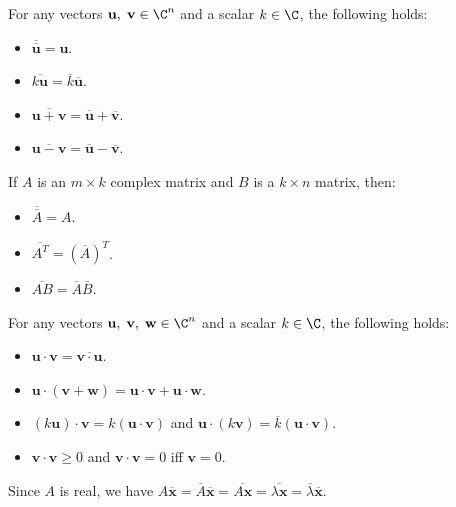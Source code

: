 For any vectors \(\mathbf{u},\;\mathbf{v} \in \C^n\) and a scalar \(k \in \C\), the following holds:
\begin{itemize}
    \item \(\overline{\overline{\mathbf{u}}} = \mathbf{u}\).
    \item \(\overline{k\mathbf{u}} = \overline{k}\overline{\mathbf{u}}\).
    \item \(\overline{\mathbf{u} + \mathbf{v}} = \overline{\mathbf{u}} + \overline{\mathbf{v}}\).
    \item \(\overline{\mathbf{u} - \mathbf{v}} = \overline{\mathbf{u}} - \overline{\mathbf{v}}\).
\end{itemize}
If \(A\) is an \(m \times k\) complex matrix and \(B\) is a \(k \times n\) matrix, then:
\begin{itemize}
    \item \(\overline{\overline{A}} = A\).
    \item \(\overline{A^T} = (\overline{A})^T\).
    \item \(\overline{AB} = \overline{A}\overline{B}\).
\end{itemize}
For any vectors \(\mathbf{u},\;\mathbf{v},\;\mathbf{w} \in \C^n\) and a scalar \(k \in \C\), the following holds:
\begin{itemize}
    \item \(\mathbf{u} \cdot \mathbf{v} = \overline{\mathbf{v} \cdot \mathbf{u}}\).
    \item \(\mathbf{u} \cdot (\mathbf{v} + \mathbf{w}) = \mathbf{u} \cdot \mathbf{v} + \mathbf{u} \cdot \mathbf{w}\).
    \item \((k \mathbf{u}) \cdot \mathbf{v} = k(\mathbf{u} \cdot \mathbf{v})\) and \(\mathbf{u} \cdot (k \mathbf{v}) = \overline{k}(\mathbf{u} \cdot \mathbf{v})\).
    \item \(\mathbf{v} \cdot \mathbf{v} \geq 0\) and \(\mathbf{v} \cdot \mathbf{v} = 0\) iff \(\mathbf{v} = 0\).
\end{itemize}

{Since \(A\) is real, we have \(A\overline{\mathbf{x}} = \overline{A}\overline{\mathbf{x}} = \overline{A\mathbf{x}} = \overline{\lambda\mathbf{x}} = \overline{\lambda}\overline{\mathbf{x}}\).}

